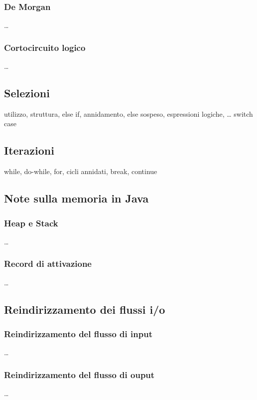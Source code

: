 \documentclass{article}
\begin{document}
\subsubsection*{De Morgan}
\dots

\subsubsection*{Cortocircuito logico}
\dots

\subsection{Selezioni}
utilizzo, struttura, else if, annidamento, else sospeso, espressioni logiche, \dots
switch case

\subsection{Iterazioni}
while, do-while, for, cicli annidati, break, continue


\subsection{Note sulla memoria in Java}
\subsubsection*{Heap e Stack}
\dots

\subsubsection*{Record di attivazione}
\dots

\subsection{Reindirizzamento dei flussi i/o}
\subsubsection*{Reindirizzamento del flusso di input}
\dots

\subsubsection*{Reindirizzamento del flusso di ouput}
\dots
\end{document}

